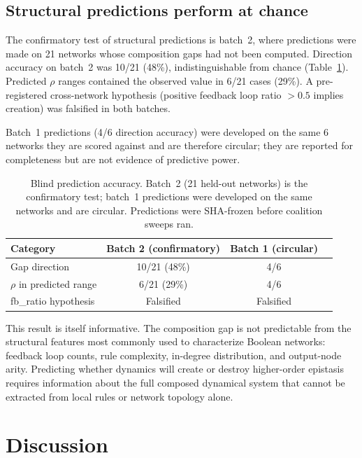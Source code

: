\documentclass[10pt]{article}
\begin{document}
\subsection{Structural predictions perform at chance}
\label{sec:blind-results}

The confirmatory test of structural predictions is batch~2, where
predictions were made on 21 networks whose composition gaps had not
been computed. Direction accuracy on batch~2 was 10/21 (48\%),
indistinguishable from chance (Table~\ref{tab:blind}). Predicted
$\rho$ ranges contained the observed value in 6/21 cases (29\%). A
pre-registered cross-network hypothesis (positive feedback loop ratio
$> 0.5$ implies creation) was falsified in both batches.

Batch~1 predictions (4/6 direction accuracy) were developed on the
same 6 networks they are scored against and are therefore circular;
they are reported for completeness but are not evidence of predictive
power.

\begin{table}[t]
\centering
\caption{Blind prediction accuracy. Batch~2 (21 held-out networks) is
the confirmatory test; batch~1 predictions were developed on the same
networks and are circular. Predictions were SHA-frozen before
coalition sweeps ran.}
\label{tab:blind}
\begin{tabular}{lccc}
\toprule
Category & Batch 2 (confirmatory) & Batch 1 (circular) \\
\midrule
Gap direction & 10/21 (48\%) & 4/6 \\
$\rho$ in predicted range & 6/21 (29\%) & 4/6 \\
fb\_ratio hypothesis & Falsified & Falsified \\
\bottomrule
\end{tabular}
\end{table}

This result is itself informative. The composition gap is not
predictable from the structural features most commonly used to
characterize Boolean networks: feedback loop counts, rule complexity,
in-degree distribution, and output-node arity. Predicting whether
dynamics will create or destroy higher-order epistasis requires
information about the full composed dynamical system that cannot be
extracted from local rules or network topology alone.


\section{Discussion}
\label{sec:discussion}
\end{document}
